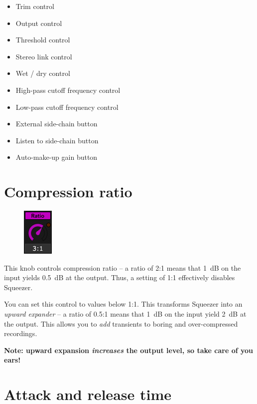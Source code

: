 \begin{itemize}
\item Trim control
\item Output control

\item Threshold control

\item Stereo link control
\item Wet / dry control

\item High-pass cutoff frequency control
\item Low-pass cutoff frequency control

\item External side-chain button
\item Listen to side-chain button

\item Auto-make-up gain button
\end{itemize}

\section{Compression ratio}

\begin{figure}
  \includegraphics[scale=\screenshotscale,clip]{include/images/knob_compression_ratio.png}
\end{figure}

This knob controls compression ratio -- a ratio of 2:1 means that
\SI{1}{\dB} on the input yields \SI{0.5}{\dB} at the output.  Thus, a
setting of 1:1 effectively disables Squeezer.

You can set this control to values below 1:1.  This transforms
Squeezer into an \emph{upward expander} -- a ratio of 0.5:1 means that
\SI{1}{\dB} on the input yield \SI{2}{\dB} at the output.  This allows
you to \emph{add} transients to boring and over-compressed recordings.

\textbf{Note: upward expansion \emph{increases} the output level, so
  take care of you ears!}

\section{Attack and release time}


